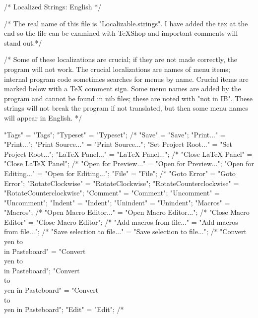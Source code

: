 /* Localized Strings: English */

/* The real name of this file is "Localizable.strings". I have added the
tex at the end so the file can be examined with TeXShop and important
comments will stand out.*/

/* Some of these localizations are crucial; if they are not made correctly,
the program will not work. The crucial localizations are names of menu items;
internal program code sometimes searches for menus by name. Crucial items are
marked below with a TeX comment sign. Some menu names are added by the
program and cannot be found in nib files; these are noted with "not in IB". These
strings will not break the program if not translated, but then some menu names will
appear in English. */

"Tags" = "Tags";  						
"Typeset" = "Typeset";					/*%
"Save" = "Save";						
"Print..." = "Print...";						
"Print Source..." = "Print Source...";			
"Set Project Root..." = "Set Project Root...";	
"LaTeX Panel..." = "LaTeX Panel...";			/*%
"Close LaTeX Panel" = "Close LaTeX Panel";	/*%
"Open for Preview..." = "Open for Preview...";	
"Open for Editing..." = "Open for Editing...";	
"File" = "File";							/*%
"Goto Error" = "Goto Error";				
"RotateClockwise" = "RotateClockwise";		
"RotateCounterclockwise" = "RotateCounterclockwise";	
"Comment" = "Comment";					
"Uncomment" = "Uncomment";				
"Indent" = "Indent";						
"Unindent" = "Unindent";					
"Macros" = "Macros";							/*%
"Open Macro Editor..." = "Open Macro Editor...";	/*%
"Close Macro Editor" = "Close Macro Editor";		/*%
"Add macros from file..." = "Add macros from file...";  /*%
"Save selection to file..." = "Save selection to file...";	/*%
"Convert \\yen to \\ in Pasteboard" = "Convert \\yen to \\ in Pasteboard";
"Convert \\ to \\yen in Pasteboard" = "Convert \\ to \\yen in Pasteboard"; 
"Edit" = "Edit";								/*%
